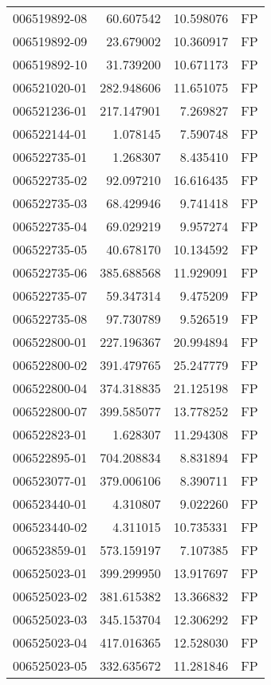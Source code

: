 \begin{tabular}{lrrl}
006519892-08 &   60.607542 &    10.598076 &   FP \\
006519892-09 &   23.679002 &    10.360917 &   FP \\
006519892-10 &   31.739200 &    10.671173 &   FP \\
006521020-01 &  282.948606 &    11.651075 &   FP \\
006521236-01 &  217.147901 &     7.269827 &   FP \\
006522144-01 &    1.078145 &     7.590748 &   FP \\
006522735-01 &    1.268307 &     8.435410 &   FP \\
006522735-02 &   92.097210 &    16.616435 &   FP \\
006522735-03 &   68.429946 &     9.741418 &   FP \\
006522735-04 &   69.029219 &     9.957274 &   FP \\
006522735-05 &   40.678170 &    10.134592 &   FP \\
006522735-06 &  385.688568 &    11.929091 &   FP \\
006522735-07 &   59.347314 &     9.475209 &   FP \\
006522735-08 &   97.730789 &     9.526519 &   FP \\
006522800-01 &  227.196367 &    20.994894 &   FP \\
006522800-02 &  391.479765 &    25.247779 &   FP \\
006522800-04 &  374.318835 &    21.125198 &   FP \\
006522800-07 &  399.585077 &    13.778252 &   FP \\
006522823-01 &    1.628307 &    11.294308 &   FP \\
006522895-01 &  704.208834 &     8.831894 &   FP \\
006523077-01 &  379.006106 &     8.390711 &   FP \\
006523440-01 &    4.310807 &     9.022260 &   FP \\
006523440-02 &    4.311015 &    10.735331 &   FP \\
006523859-01 &  573.159197 &     7.107385 &   FP \\
006525023-01 &  399.299950 &    13.917697 &   FP \\
006525023-02 &  381.615382 &    13.366832 &   FP \\
006525023-03 &  345.153704 &    12.306292 &   FP \\
006525023-04 &  417.016365 &    12.528030 &   FP \\
006525023-05 &  332.635672 &    11.281846 &   FP \\

\end{tabular}
